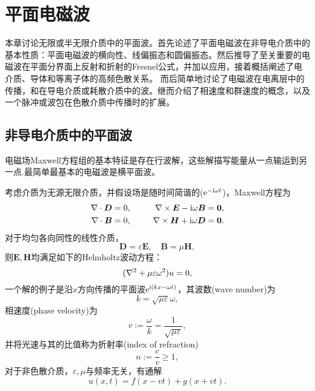 \chapter{平面电磁波}
\label{chap:plane wave}
本章讨论无限或半无限介质中的平面波。首先论述了平面电磁波在非导电介质中的基本性质：平面电磁波的横向性、线偏振态和圆偏振态。然后推导了至关重要的电磁波在平面分界面上反射和折射的Fresnel公式，并加以应用，接着概括阐述了电介质、导体和等离子体的高频色散关系。%
而后简单地讨论了电磁波在电离层中的传播，和在导电介质或耗散介质中的波。继而介绍了相速度和群速度的概念，以及一个脉冲或波包在色散介质中传播时的扩展。%
\section{非导电介质中的平面波}
电磁场Maxwell方程组的基本特征是存在行波解，这些解描写能量从一点输运到另一点.最简单最基本的电磁波是横平面波。%
\iffalse
当没有源存在时，无限介质中的Maxwell方程组是：
\begin{alignat*}{2}
    \div\bm D&=0,&\qquad\curl\bm E+\pv{\bm B}t&=\bm 0,\\
    \div\bm B&=0,&\curl\bm H-\pv{\bm D}t&=\bm 0.    
\end{alignat*}
\fi

考虑介质为无源无限介质，并假设场是随时间简谐的($\mathop{}\!\mathrm{e}^{-\mathrm{i}\omega t}$)，Maxwell方程为
\begin{alignat*}{2}
    \nabla\cdot\bm D&=0,&\qquad\nabla\times\bm E-\mathrm{i}\omega\bm B&=\bm 0,\\
    \nabla\cdot\bm B&=0,&\nabla\times\bm H+\mathrm{i}\omega\bm D&=\bm 0.    
\end{alignat*}
对于均匀各向同性的线性介质，
\[
    \bm D=\varepsilon\bm E,\quad\bm B=\mu\bm H,
\]
则$\bm E,\bm H$均满足如下的Helmholtz波动方程：
\begin{equation}
    (\nabla^2+\mu\varepsilon\omega^2)u=0,
\end{equation}
一个解的例子是沿$x$方向传播的平面波$\mathop{}\!\mathrm{e}^{\mathrm{i}(kx-\omega t)}$，其波数(wave number)为
\[
    k=\sqrt{\mu\varepsilon}\omega,
\]
相速度(phase velocity)为
\begin{equation}
    v:=\frac{\omega}k=\frac1{\sqrt{\mu\varepsilon}},
\end{equation}
并将光速与其的比值称为折射率(index of refraction)
\begin{equation}
    n:=\frac cv\geqslant1,
\end{equation}
对于非色散介质，$\varepsilon,\mu$与频率无关，有通解
\[
    u(x,t)=f(x-vt)+g(x+vt).
\]
